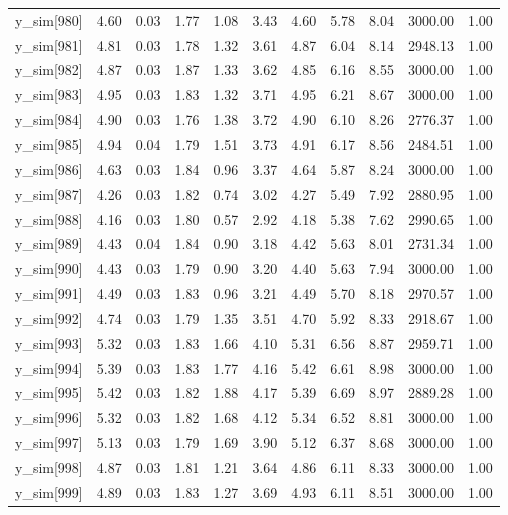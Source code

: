\begin{table}[ht]
\begin{tabular}{rrrrrrrrrrr}
  y\_sim[980] & 4.60 & 0.03 & 1.77 & 1.08 & 3.43 & 4.60 & 5.78 & 8.04 & 3000.00 & 1.00 \\ 
  y\_sim[981] & 4.81 & 0.03 & 1.78 & 1.32 & 3.61 & 4.87 & 6.04 & 8.14 & 2948.13 & 1.00 \\ 
  y\_sim[982] & 4.87 & 0.03 & 1.87 & 1.33 & 3.62 & 4.85 & 6.16 & 8.55 & 3000.00 & 1.00 \\ 
  y\_sim[983] & 4.95 & 0.03 & 1.83 & 1.32 & 3.71 & 4.95 & 6.21 & 8.67 & 3000.00 & 1.00 \\ 
  y\_sim[984] & 4.90 & 0.03 & 1.76 & 1.38 & 3.72 & 4.90 & 6.10 & 8.26 & 2776.37 & 1.00 \\ 
  y\_sim[985] & 4.94 & 0.04 & 1.79 & 1.51 & 3.73 & 4.91 & 6.17 & 8.56 & 2484.51 & 1.00 \\ 
  y\_sim[986] & 4.63 & 0.03 & 1.84 & 0.96 & 3.37 & 4.64 & 5.87 & 8.24 & 3000.00 & 1.00 \\ 
  y\_sim[987] & 4.26 & 0.03 & 1.82 & 0.74 & 3.02 & 4.27 & 5.49 & 7.92 & 2880.95 & 1.00 \\ 
  y\_sim[988] & 4.16 & 0.03 & 1.80 & 0.57 & 2.92 & 4.18 & 5.38 & 7.62 & 2990.65 & 1.00 \\ 
  y\_sim[989] & 4.43 & 0.04 & 1.84 & 0.90 & 3.18 & 4.42 & 5.63 & 8.01 & 2731.34 & 1.00 \\ 
  y\_sim[990] & 4.43 & 0.03 & 1.79 & 0.90 & 3.20 & 4.40 & 5.63 & 7.94 & 3000.00 & 1.00 \\ 
  y\_sim[991] & 4.49 & 0.03 & 1.83 & 0.96 & 3.21 & 4.49 & 5.70 & 8.18 & 2970.57 & 1.00 \\ 
  y\_sim[992] & 4.74 & 0.03 & 1.79 & 1.35 & 3.51 & 4.70 & 5.92 & 8.33 & 2918.67 & 1.00 \\ 
  y\_sim[993] & 5.32 & 0.03 & 1.83 & 1.66 & 4.10 & 5.31 & 6.56 & 8.87 & 2959.71 & 1.00 \\ 
  y\_sim[994] & 5.39 & 0.03 & 1.83 & 1.77 & 4.16 & 5.42 & 6.61 & 8.98 & 3000.00 & 1.00 \\ 
  y\_sim[995] & 5.42 & 0.03 & 1.82 & 1.88 & 4.17 & 5.39 & 6.69 & 8.97 & 2889.28 & 1.00 \\ 
  y\_sim[996] & 5.32 & 0.03 & 1.82 & 1.68 & 4.12 & 5.34 & 6.52 & 8.81 & 3000.00 & 1.00 \\ 
  y\_sim[997] & 5.13 & 0.03 & 1.79 & 1.69 & 3.90 & 5.12 & 6.37 & 8.68 & 3000.00 & 1.00 \\ 
  y\_sim[998] & 4.87 & 0.03 & 1.81 & 1.21 & 3.64 & 4.86 & 6.11 & 8.33 & 3000.00 & 1.00 \\ 
  y\_sim[999] & 4.89 & 0.03 & 1.83 & 1.27 & 3.69 & 4.93 & 6.11 & 8.51 & 3000.00 & 1.00 \\ 

\end{tabular}
\end{table}
